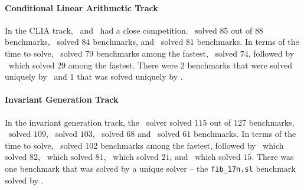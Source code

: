 


\paragraph{Conditional Linear Arithmetic Track}
In the CLIA track, \cvcnew\ and \dryd\ had a close competition.
\cvcnew\ solved $85$ out of $88$ benchmarks, \dryd\ solved $84$ benchmarks, and \eusolvernew\ solved $81$ benchmarks.
In terms of the time to solve, \dryd\ solved $79$ benchmarks among the fastest, \cvcnew\ solved $74$,
followed by \eusolvernew\ which solved $29$ among the fastest.
There were $2$ benchmarks that were solved uniquely by \dryd\ and $1$ that was solved uniquely by \cvcnew.

\paragraph{Invariant Generation Track}
In the invariant generation track, the \lig\ solver solved $115$ out of $127$ benchmarks, \cvcnew\ solved $109$, \dryd\ solved $103$,
\horndini\ solved $68$ and \eusolvernew\ solved $61$ benchmarks.
In terms of the time to solve, \lig\ solved $102$ benchmarks among the fastest, followed by \cvcnew\ which solved $82$,
\dryd\ which solved $81$, \horndini\ which solved $21$, and \eusolvernew\ which solved $15$.
There was one benchmark that was solved by a unique solver -- the \texttt{fib_17n.sl} benchmark solved by \lig. 

